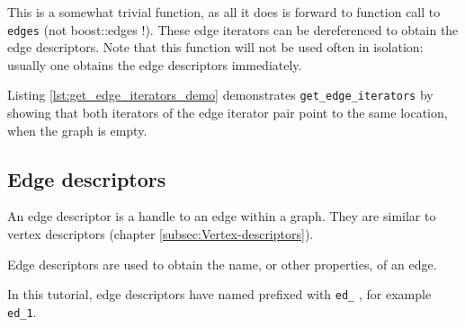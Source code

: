 This is a somewhat trivial function, as all it does is forward to function
call to \verb;edges; 
(not boost::edges !). 
These edge iterators can be dereferenced to obtain the edge descriptors.
Note that this function will not be used often in isolation: usually one
obtains the edge descriptors immediately.

Listing \ref{lst:get_edge_iterators_demo}
demonstrates \verb;get_edge_iterators; by showing that both iterators of the
edge iterator pair point to the same location, when the graph is empty.



\subsection{Edge descriptors}
\label{subsec:Edge-descriptors}

An edge descriptor is a handle to an edge within a graph.
They are similar to vertex descriptors (chapter \ref{subsec:Vertex-descriptors}).

Edge descriptors are used to obtain the name, or other properties, of an edge.

In this tutorial, edge descriptors have named prefixed with \verb;ed_;
, for example \verb;ed_1;.

